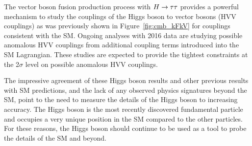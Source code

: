 The vector boson fusion production process with $H\to\tau\tau$ provides a 
powerful mechanism to study the couplings of the Higgs boson to vector bosons
(HVV couplings) as was previously shown in Figure~\ref{fig:cmb_kFkV} for couplings
consistent with the SM. Ongoing analyses with 2016 data are studying possible
anomalous HVV couplings from additional coupling terms introduced into the SM Lagrangian. 
These studies are expected to provide the tightest constraints at the 2$\sigma$ 
level on possible anomalous HVV couplings.

The impressive agreement of these Higgs boson results and other previous results
with SM predictions, and the lack of any observed physics signatures beyond
the SM, point to the need to measure the details of the Higgs boson to increasing
accuracy. The Higgs boson is the most recently discovered fundamental particle and occupies a very
unique position in the SM compared to the other particles. For these reasons,
the Higgs boson should continue to be used as a tool to probe the details of the SM and beyond.




